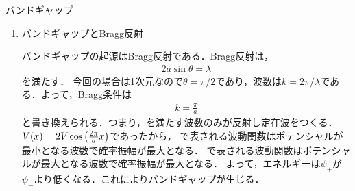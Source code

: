 \documentclass{report}
\begin{document}
\begin{myex}{バンドギャップ}{}
\begin{enumerate}
        の$\alpha$と$\beta$はの解であるから，$\sqrt{\alpha^2 + \beta^2} = 1$なる規格化条件を課すと，
        \begin{align}
          \mqty(\alpha \\ \beta) = 
          \begin{dcases}
            \frac{1}{\sqrt{2}}\mqty(1 \\ 1) & E_n^{(1)} = V \\ 
            \frac{1}{\sqrt{2}}\mqty(1 \\ -1) & E_n^{(1)} = -V
          \end{dcases}
        \end{align}
        となる．よって，
        $\Delta E = \pm V$に対応する波動関数はBrillouinゾーン端で，
        \begin{align}
          \psi_{+}& = \frac{1}{\sqrt{2}}\qty(\phi_{\pi/a} + \phi_{-\pi/a})\propto\cos\qty(\frac{\pi}{a}x)\label{degeneracy-wave-function-positive}\\
          \psi_{-}& = \frac{1}{\sqrt{2}}\qty(\phi_{\pi/a} - \phi_{-\pi/a})\propto\sin\qty(\frac{\pi}{a}x)\label{degeneracy-wave-function-negative}
        \end{align}
        であり，定在波が生じる．
    \item バンドギャップとBragg反射\par
      バンドギャップの起源はBragg反射である．Bragg反射は，
      \begin{align}
        2a\sin\theta = \lambda
      \end{align}
      を満たす．
      今回の場合は1次元なので$\theta = \pi/2$であり，波数は$k = 2\pi/\lambda$である．よって，Bragg条件は
      \begin{align}
        k = \frac{\pi}{a}\label{1d-bragg-k-condition}
      \end{align}
      と書き換えられる．つまり，を満たす波数のみが反射し定在波をつくる．$V(x) = 2V\cos\qty(\frac{2\pi}{a}x)$であったから，
      で表される波動関数はポテンシャルが最小となる波数で確率振幅が最大となる．
      で表される波動関数はポテンシャルが最大となる波数で確率振幅が最大となる．
      よって，エネルギーは$\psi_+$が$\psi_-$より低くなる．これによりバンドギャップが生じる．
  \end{enumerate}
  \end{myex}
\end{document}
